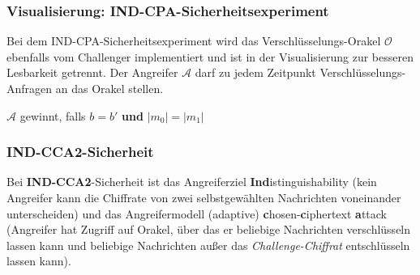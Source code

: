 \documentclass[12pt,A4]{extarticle}
\newcommand{\highlight}[1]{\textcolor{highlightColor}{\textbf{#1}}}
\begin{document}
\subsubsection{Visualisierung: IND-CPA-Sicherheitsexperiment}
Bei dem IND-CPA-Sicherheitsexperiment wird das Verschlüsselungs-Orakel $\mathcal{O}$ ebenfalls vom Challenger implementiert und ist in der Visualisierung zur besseren Lesbarkeit getrennt. Der Angreifer $\mathcal{A}$ darf zu jedem Zeitpunkt Verschlüsselungs-Anfragen an das Orakel stellen.\par
{}

$\mathcal{A}$ gewinnt, falls $b = b'$ \textbf{und} $|m_0| = |m_1|$

\subsubsection{IND-CCA2-Sicherheit}\label{sec:ind-cca2}
Bei \highlight{IND-CCA2}-Sicherheit ist das Angreiferziel \textbf{Ind}istinguishability (kein Angreifer kann die Chiffrate von zwei selbstgewählten Nachrichten voneinander unterscheiden) und das Angreifermodell (adaptive) \textbf{c}hosen-\textbf{c}iphertext \textbf{a}ttack (Angreifer hat Zugriff auf Orakel, über das er beliebige Nachrichten verschlüsseln lassen kann und beliebige Nachrichten außer das \textit{Challenge-Chiffrat} entschlüsseln lassen kann).
\end{document}
